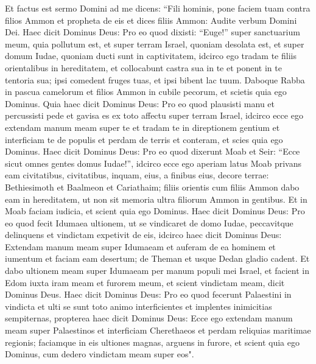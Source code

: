 \begin{biblechapter}  
\verse Et factus est sermo Domini ad me dicens: 
\verse “Fili hominis, pone faciem tuam contra filios Ammon et propheta de eis 
\verse et dices filiis Ammon: Audite verbum Domini Dei. Haec dicit Dominus Deus: Pro eo quod dixisti: “Euge!” super sanctuarium meum, quia pollutum est, et super terram Israel, quoniam desolata est, et super domum Iudae, quoniam ducti sunt in captivitatem, 
\verse idcirco ego tradam te filiis orientalibus in hereditatem, et collocabunt castra sua in te et ponent in te tentoria sua; ipsi comedent fruges tuas, et ipsi bibent lac tuum. 
\verse Daboque Rabba in pascua camelorum et filios Ammon in cubile pecorum, et scietis quia ego Dominus. 
\verse Quia haec dicit Dominus Deus: Pro eo quod plausisti manu et percussisti pede et gavisa es ex toto affectu super terram Israel, 
\verse idcirco ecce ego extendam manum meam super te et tradam te in direptionem gentium et interficiam te de populis et perdam de terris et conteram, et scies quia ego Dominus. 
\verse Haec dicit Dominus Deus: Pro eo quod dixerunt Moab et Seir: “Ecce sicut omnes gentes domus Iudae!”, 
\verse idcirco ecce ego aperiam latus Moab privans eam civitatibus, civitatibus, inquam, eius, a finibus eius, decore terrae: Bethiesimoth et Baalmeon et Cariathaim; 
\verse filiis orientis cum filiis Ammon dabo eam in hereditatem, ut non sit memoria ultra filiorum Ammon in gentibus.  
\verse Et in Moab faciam iudicia, et scient quia ego Dominus. 
\verse Haec dicit Dominus Deus: Pro eo quod fecit Idumaea ultionem, ut se vindicaret de domo Iudae, peccavitque delinquens et vindictam expetivit de eis, 
\verse idcirco haec dicit Dominus Deus: Extendam manum meam super Idumaeam et auferam de ea hominem et iumentum et faciam eam desertum; de Theman et usque Dedan gladio cadent. 
\verse Et dabo ultionem meam super Idumaeam per manum populi mei Israel, et facient in Edom iuxta iram meam et furorem meum, et scient vindictam meam, dicit Dominus Deus. 
\verse Haec dicit Dominus Deus: Pro eo quod fecerunt Palaestini in vindicta et ulti se sunt toto animo interficientes et implentes inimicitias sempiternas, 
\verse propterea haec dicit Dominus Deus: Ecce ego extendam manum meam super Palaestinos et interficiam Cherethaeos et perdam reliquias maritimae regionis; 
\verse faciamque in eis ultiones magnas, arguens in furore, et scient quia ego Dominus, cum dedero vindictam meam super eos". 
\end{biblechapter}

